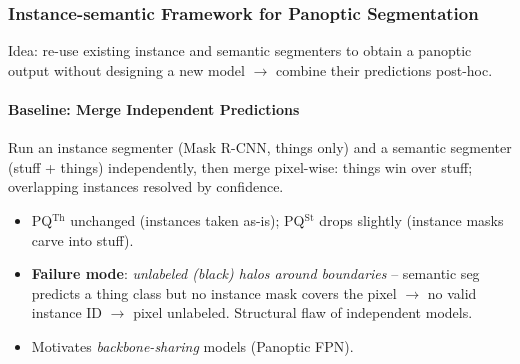 \documentclass{article}
\begin{document}
\subsubsection{Instance-semantic Framework for Panoptic Segmentation}
Idea: re-use existing instance and semantic segmenters to obtain a panoptic output without designing a new model $\rightarrow$ combine their predictions post-hoc.

\paragraph{Baseline: Merge Independent Predictions}
Run an instance segmenter (Mask R-CNN, things only) and a semantic segmenter (stuff + things) independently, then merge pixel-wise: things win over stuff; overlapping instances resolved by confidence.
\begin{itemize}
    \item PQ$^\text{Th}$ unchanged (instances taken as-is); PQ$^\text{St}$ drops slightly (instance masks carve into stuff).
    \item \textbf{Failure mode}: \textit{unlabeled (black) halos around boundaries} -- semantic seg predicts a thing class but no instance mask covers the pixel $\rightarrow$ no valid instance ID $\rightarrow$ pixel unlabeled. Structural flaw of independent models.
    \item Motivates \textit{backbone-sharing} models (Panoptic FPN).
\end{itemize}
\end{document}
